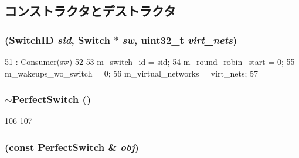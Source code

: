 \subsection{コンストラクタとデストラクタ}
\hypertarget{classPerfectSwitch_ae33d3c4e7ad672dcef325947b8c6c306}{
\subsubsection[{PerfectSwitch}]{ ({\bf SwitchID} {\em sid}, \/  {\bf Switch} $\ast$ {\em sw}, \/  {\bf uint32\_\-t} {\em virt\_\-nets})}}
\label{classPerfectSwitch_ae33d3c4e7ad672dcef325947b8c6c306}



\begin{DoxyCode}
51     : Consumer(sw)
52 {
53     m_switch_id = sid;
54     m_round_robin_start = 0;
55     m_wakeups_wo_switch = 0;
56     m_virtual_networks = virt_nets;
57 }
\end{DoxyCode}
\hypertarget{classPerfectSwitch_a86d266f35b6d2d7f0f7887a31a6e1978}{
\subsubsection[{$\sim$PerfectSwitch}]{\setlength{\rightskip}{0pt plus 5cm}$\sim${\bf PerfectSwitch} ()}}
\label{classPerfectSwitch_a86d266f35b6d2d7f0f7887a31a6e1978}



\begin{DoxyCode}
106 {
107 }
\end{DoxyCode}
\hypertarget{classPerfectSwitch_a787abd150358b9f808fe959f9cb079ee}{
\subsubsection[{PerfectSwitch}]{ (const {\bf PerfectSwitch} \& {\em obj})}}
\label{classPerfectSwitch_a787abd150358b9f808fe959f9cb079ee}


